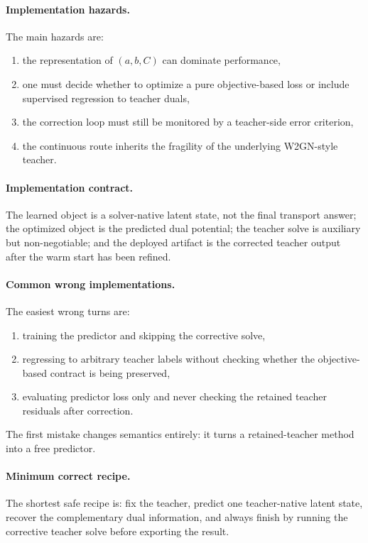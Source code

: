 \documentclass[11pt]{report}
\begin{document}
\paragraph{Implementation hazards.}
The main hazards are:
\begin{enumerate}[label=(\roman*)]
  \item the representation of $(a,b,C)$ can dominate performance,
  \item one must decide whether to optimize a pure objective-based loss or include supervised regression to teacher duals,
  \item the correction loop must still be monitored by a teacher-side error criterion,
  \item the continuous route inherits the fragility of the underlying W2GN-style teacher.
\end{enumerate}

\paragraph{Implementation contract.}
The learned object is a solver-native latent state, not the final transport answer; the
optimized object is the predicted dual potential; the teacher solve is auxiliary but
non-negotiable; and the deployed artifact is the corrected teacher output after the
warm start has been refined.

\paragraph{Common wrong implementations.}
The easiest wrong turns are:
\begin{enumerate}[label=(\roman*)]
  \item training the predictor and skipping the corrective solve,
  \item regressing to arbitrary teacher labels without checking whether the objective-based contract is being preserved,
  \item evaluating predictor loss only and never checking the retained teacher residuals after correction.
\end{enumerate}
The first mistake changes semantics entirely: it turns a retained-teacher method into a
free predictor.

\paragraph{Minimum correct recipe.}
The shortest safe recipe is: fix the teacher, predict one teacher-native latent state,
recover the complementary dual information, and always finish by running the corrective
teacher solve before exporting the result.
\end{document}

